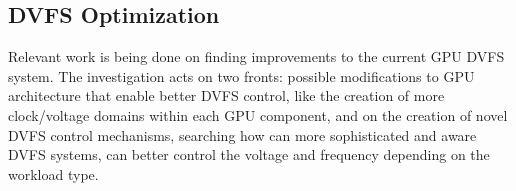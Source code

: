



\subsection{DVFS Optimization}

Relevant work is being done on finding improvements to the current GPU DVFS system. The investigation acts on two fronts: possible modifications to GPU architecture that enable better DVFS control, like the creation of more clock/voltage domains within each GPU component, and on the creation of novel DVFS control mechanisms, searching how can more sophisticated and aware DVFS systems, can better control the voltage and frequency depending on the workload type.

